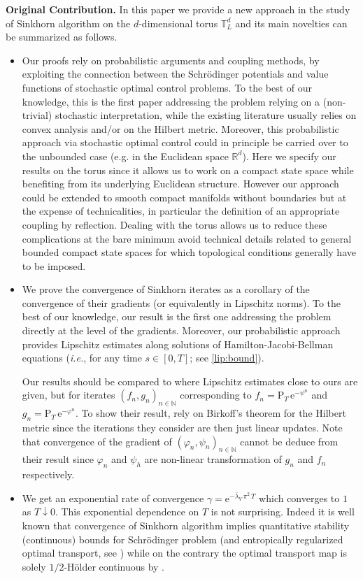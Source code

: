 \documentclass[final,12pt]{colt2023} %
\def\ie{\textit{i.e.}}
\newcommand{\bbRD}{\mathbb{R}^d}
\newcommand{\rmP}{\mathrm{P}}
\newcommand{\rme}{\mathrm{e}}
\def\nset{\mathbb{N}}
\def\ie{\textit{i.e.}}
\def\blambda{\bar{\lambda}}
\def\blambdaV{\blambda_V}
\begin{document}
\bigskip
\noindent\textbf{Original Contribution.} In this paper we provide a new approach in the study of Sinkhorn algorithm on the $d$-dimensional torus $\mathbb{T}_L^d$ and its main novelties can be summarized as follows.
\begin{itemize}
\item Our proofs rely on probabilistic arguments and coupling methods, by exploiting the connection between the Schr\"odinger potentials and value functions of stochastic optimal control problems. To the best of our knowledge, this is the first paper addressing the problem relying on a (non-trivial) stochastic interpretation, while the existing literature usually relies on convex analysis and/or on the Hilbert metric. Moreover, this probabilistic approach via stochastic optimal control could in principle be carried over to the unbounded case (e.g. in the Euclidean space $\bbRD$).
Here we specify our results on the torus since it allows us to work on a compact state space while benefiting from its underlying Euclidean structure. However
 our approach could be extended to smooth compact manifolds without boundaries but at the expense of technicalities, in particular the definition of an appropriate coupling by reflection. Dealing with the torus allows us to reduce these complications at the bare minimum 
avoid technical details related to general bounded compact state spaces for which topological conditions generally have to be imposed.


\item We prove the convergence of Sinkhorn iterates as a corollary of the convergence of their gradients (or equivalently in Lipschitz norms). To the best of our knowledge, our result is the first one addressing the problem directly at the level of the gradients.
Moreover, our probabilistic approach provides Lipschitz estimates 
along solutions of Hamilton-Jacobi-Bellman equations (\ie, for any time $s\in[0,T]$; see \eqref{lip:bound}). 

Our results should be compared to   \cite{deligiannidis2021quantitative} where Lipschitz estimates close to ours are given,  but for iterates $(f_n,g_n)_{n \in\nset}$ corresponding to $f_n = \rmP_T\,\rme^{-\psi^n}$ and $g_n=\rmP_T\,\rme^{-\varphi^n}$. To show their result,  \cite{deligiannidis2021quantitative} rely on Birkoff's theorem for the Hilbert metric since the iterations they consider are then just linear updates. Note that convergence of the gradient of $(\varphi_n,\psi_n)_{n\in\nset}$ cannot be deduce from their result since $\varphi_n$ and $\psi_h$ are non-linear transformation of $g_n$ and $f_n$ respectively.  

\item We get an exponential rate of convergence $\gamma=\rme^{-\blambdaV\,\pi^2\,T}$ which converges to $1$ as $T\downarrow 0$. This exponential dependence on $T$ is not surprising. Indeed it is well known that convergence of Sinkhorn algorithm implies quantitative stability (continuous) bounds for Schr\"odinger problem (and entropically regularized optimal transport, see \cite{eckstein2021quantitative}) while on the contrary the optimal transport map is solely $1/2$-H\"older continuous by \cite{gigli2011holder}.
\end{itemize}
\end{document}
